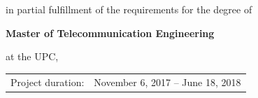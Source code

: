 \begin{titlepage}
\begin{center}
\bigskip
\bigskip

{\makeatletter
\titlefont\Large\@author
\makeatother}

\bigskip
\bigskip

in partial fulfillment of the requirements for the degree of

\bigskip
\bigskip

{\bfseries Master of Telecommunication Engineering}

\bigskip
\bigskip

at the UPC,


\vfill

\begin{tabular}{lll}
    Project duration: & \multicolumn{2}{l}{November 6, 2017 -- June 18, 2018} \\
       
\end{tabular}


\end{center}
\end{titlepage}
